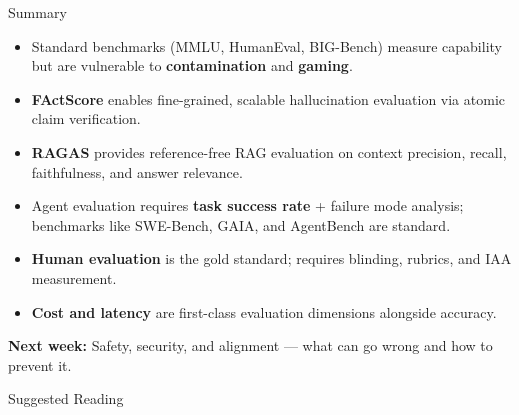 \documentclass[aspectratio=169,10pt]{beamer}
\begin{document}
\begin{frame}{Summary}
  \begin{itemize}
    \item Standard benchmarks (MMLU, HumanEval, BIG-Bench) measure capability but are vulnerable to \textbf{contamination} and \textbf{gaming}.
    \item \textbf{FActScore} enables fine-grained, scalable hallucination evaluation via atomic claim verification.
    \item \textbf{RAGAS} provides reference-free RAG evaluation on context precision, recall, faithfulness, and answer relevance.
    \item Agent evaluation requires \textbf{task success rate} + failure mode analysis; benchmarks like SWE-Bench, GAIA, and AgentBench are standard.
    \item \textbf{Human evaluation} is the gold standard; requires blinding, rubrics, and IAA measurement.
    \item \textbf{Cost and latency} are first-class evaluation dimensions alongside accuracy.
  \end{itemize}
  \vspace{0.3em}
  \textbf{Next week:} Safety, security, and alignment — what can go wrong and how to prevent it.
\end{frame}

\begin{frame}[allowframebreaks]{Suggested Reading}
  \nocite{hendrycks2020mmlu, chen2021humaneval, min2023factscore,
          srivastava2022bigbench, es2023ragas}
  
\end{frame}
\end{document}
